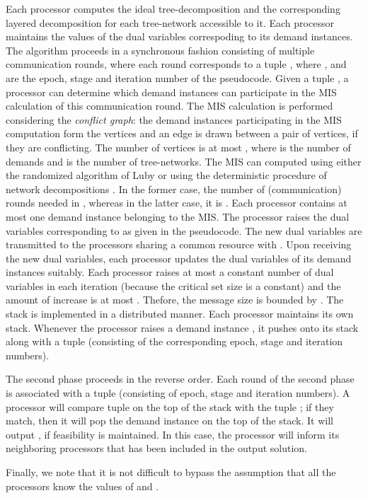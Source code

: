 \documentclass[11pt]{article}
\begin{document}
Each processor  computes the ideal tree-decomposition and the corresponding layered decomposition
for each tree-network  accessible to it.
Each processor maintains the values of the dual variables correspoding to its demand instances.
The algorithm proceeds in a synchronous fashion consisting of multiple communication rounds,
where each round corresponds to a tuple ,
where ,  and  are the epoch, stage and iteration number of the pseudocode.
Given a tuple ,
a processor  can determine which demand instances can participate in the MIS calculation of this 
communication round. The MIS calculation is performed considering the {\em conflict graph}:
the demand instances participating in the MIS computation form the vertices
and an edge is drawn between a pair of vertices, if they are conflicting.
The number of vertices is at most , where  is the number of demands
and  is the number of tree-networks.
The MIS can computed using either the randomized algorithm of Luby \cite{Luby}
or using the deterministic procedure of network decompositions \cite{PancSrini}.
In the former case, the number of (communication) rounds needed in , whereas
in the latter case, it is .
Each processor  contains at most one demand instance  belonging to the MIS.
The processor  raises the dual variables corresponding to  as given in the pseudocode.
The new dual variables are transmitted to the processors sharing a common resource with .
Upon receiving the new dual variables, each processor updates the dual variables of its demand instances suitably.
Each processor  raises at most a constant number of dual variables in each iteration (because the critical set 
size  is a constant) and the amount of increase is at most .
Thefore, the message size is bounded by .
The stack is implemented in a distributed manner. Each processor  maintains its own stack.
Whenever the processor  raises a demand instance , it pushes  onto its stack
along with a tuple  (consisting of the corresponding epoch, stage and iteration numbers).

The second phase proceeds in the reverse order. Each round of the second phase
is associated with a tuple  (consisting of epoch, stage and iteration numbers).  
A processor  will compare tuple  on the top of the stack
with the tuple ; if they match, then it will pop the demand instance  on the top of the stack.
It will output , if feasibility is maintained.
In this case, the processor  will inform its neighboring processors
that  has been included in the output solution.

Finally, we note that it is not difficult to bypass the assumption that all the processors know 
the values of  and .
\end{document}
